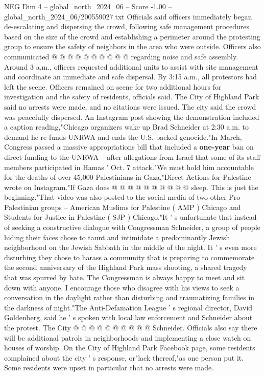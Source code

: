 \begin{textsample}{NEG Dim 4 – global\_north\_2024\_06 – Score -1.00 – global\_north\_2024\_06/200559027.txt}
Officials said officers immediately began de-escalating and dispersing the crowd, following safe management procedures based on the size of the crowd and establishing a perimeter around the protesting group to ensure the safety of neighbors in the area who were outside.
Officers also communicated @ @ @ @ @ @ @ @ @ @ regarding noise and safe assembly.
Around 3 a.m., officers requested additional units to assist with site management and coordinate an immediate and safe dispersal.
By 3:15 a.m., all protestors had left the scene.
Officers remained on scene for two additional hours for investigation and the safety of residents, officials said.
The City of Highland Park said no arrests were made, and no citations were issued.
The city said the crowd was peacefully dispersed.
An Instagram post showing the demonstration included a caption reading,"Chicago organizers wake up Brad Schneider at 2:30 a.m. to demand he re-funds UNRWA and ends the U.S.-backed genocide."In March, Congress passed a massive appropriations bill that included a \textbf{one-year} ban on direct funding to the UNRWA -- after allegations from Israel that some of its staff members participated in Hamas ' Oct. 7 attack."We must hold him accountable for the deaths of over 45,000 Palestinians in Gaza,"Direct Actions for Palestine wrote on Instagram."If Gaza does @ @ @ @ @ @ @ @ @ @ sleep.
This is just the beginning."That video was also posted to the social media of two other Pro-Palestinian groups -- American Muslims for Palestine ( AMP ) Chicago and Students for Justice in Palestine ( SJP ) Chicago."It ' s unfortunate that instead of seeking a constructive dialogue with Congressman Schneider, a group of people hiding their faces chose to taunt and intimidate a predominantly Jewish neighborhood on the Jewish Sabbath in the middle of the night.
It ' s even more disturbing they chose to harass a community that is preparing to commemorate the second anniversary of the Highland Park mass shooting, a shared tragedy that was spurred by hate.
The Congressman is always happy to meet and sit down with anyone.
I encourage those who disagree with his views to seek a conversation in the daylight rather than disturbing and traumatizing families in the darkness of night."The Anti-Defamation League ' s regional director, David Goldenberg, said he ' s spoken with local law enforcement and Schneider about the protest.
The City @ @ @ @ @ @ @ @ @ @ Schneider.
Officials also say there will be additional patrols in neighborhoods and implementing a close watch on houses of worship.
On the City of Highland Park Facebook page, some residents complained about the city ' s response, or"lack thereof,"as one person put it.
Some residents were upset in particular that no arrests were made.

\end{textsample}
